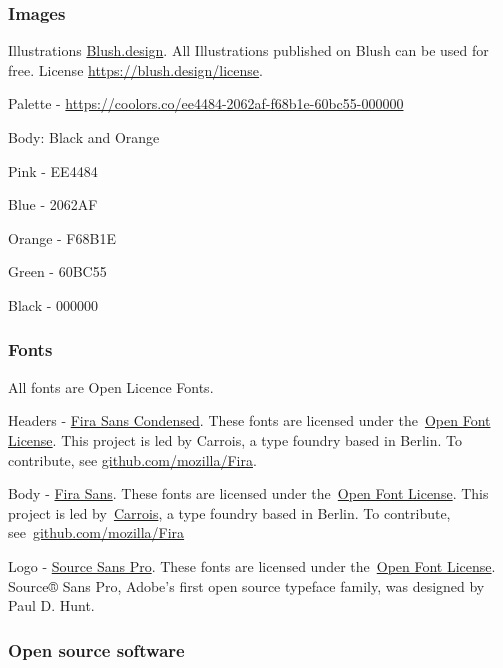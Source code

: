 \documentclass{article}
\begin{document}
\subsubsection{Images}\label{H3168740}



Illustrations \href{https://blush.design/}{Blush.design}. All Illustrations published on Blush can be used for free. License \href{https://blush.design/license}{https://blush.design/license}.


Palette - \href{https://coolors.co/ee4484-2062af-f68b1e-60bc55-000000}{https://coolors.co/ee4484-2062af-f68b1e-60bc55-000000}


Body: Black and Orange


Pink - EE4484


Blue - 2062AF


Orange - F68B1E


Green - 60BC55


Black - 000000


\subsubsection{Fonts}\label{H649993}



All fonts are Open Licence Fonts.


Headers - \href{https://fonts.google.com/specimen/Fira+Sans+Condensed}{Fira Sans Condensed}. These fonts are licensed under the \href{https://scripts.sil.org/cms/scripts/page.php?site_id=nrsi&id=OFL}{Open Font License}. This project is led by Carrois, a type foundry based in Berlin. To contribute, see \href{https://github.com/mozilla/Fira}{github.com/mozilla/Fira}.


Body - \href{https://fonts.google.com/specimen/Fira+Sans}{Fira Sans}. These fonts are licensed under the \href{https://scripts.sil.org/cms/scripts/page.php?site_id=nrsi&id=OFL}{Open Font License}. This project is led by \href{https://carrois.com/}{Carrois}, a type foundry based in Berlin. To contribute, see \href{https://github.com/mozilla/Fira}{github.com/mozilla/Fira} 


Logo - \href{https://fonts.google.com/specimen/Source+Sans+Pro}{Source Sans Pro}. These fonts are licensed under the \href{https://scripts.sil.org/cms/scripts/page.php?site_id=nrsi&id=OFL}{Open Font License}. Source® Sans Pro, Adobe's first open source typeface family, was designed by Paul D. Hunt. 


\subsubsection{Open source software}\label{H319315}
\end{document}
